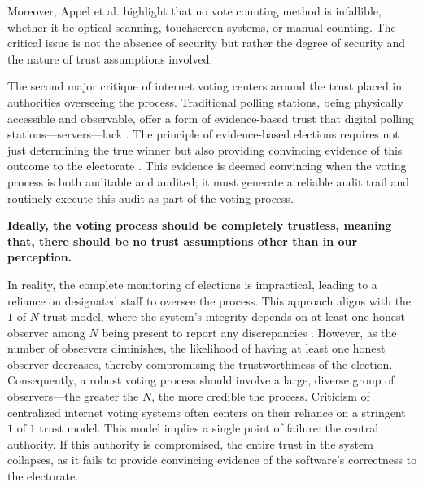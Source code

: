 \documentclass[runningheads]{llncs}
\begin{document}
Moreover, Appel et al. \cite{appelEvidenceBasedElectionsCreate2019} highlight that no vote counting method is infallible, whether it be optical scanning, touchscreen systems, or manual counting. The critical issue is not the absence of security but rather the degree of security and the nature of trust assumptions involved.

The second major critique of internet voting centers around the trust placed in authorities overseeing the process. Traditional polling stations, being physically accessible and observable, offer a form of evidence-based trust that digital polling stations—servers—lack \cite{starkEvidenceBasedElections2012}. The principle of evidence-based elections requires not just determining the true winner but also providing convincing evidence of this outcome to the electorate \cite{appelEvidenceBasedElectionsCreate2019}. This evidence is deemed convincing when the voting process is both auditable and audited; it must generate a reliable audit trail and routinely execute this audit as part of the voting process.

\textbf{Ideally, the voting process should be completely trustless, meaning that, there should be no trust assumptions other than in our perception.}

In reality, the complete monitoring of elections is impractical, leading to a reliance on designated staff to oversee the process. This approach aligns with the $1 \textrm{ of } N$ trust model, where the system's integrity depends on at least one honest observer among $N$ being present to report any discrepancies \cite{buterinTrustModels2020}. However, as the number of observers diminishes, the likelihood of having at least one honest observer decreases, thereby compromising the trustworthiness of the election. Consequently, a robust voting process should involve a large, diverse group of observers—the greater the $N$, the more credible the process.
Criticism of centralized internet voting systems often centers on their reliance on a stringent $1\textrm{ of }1$ trust model. This model implies a single point of failure: the central authority. If this authority is compromised, the entire trust in the system collapses, as it fails to provide convincing evidence of the software's correctness to the electorate.
\end{document}
